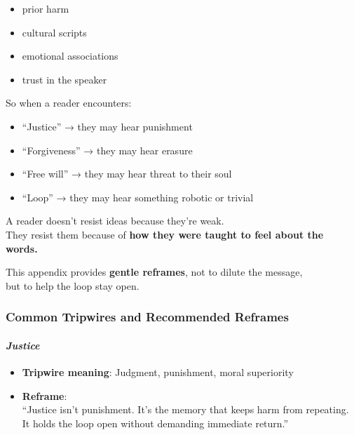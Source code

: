 \begin{itemize}
\item
  prior harm
\item
  cultural scripts
\item
  emotional associations
\item
  trust in the speaker
\end{itemize}

So when a reader encounters:

\begin{itemize}
\item
  ``Justice'' → they may hear punishment
\item
  ``Forgiveness'' → they may hear erasure
\item
  ``Free will'' → they may hear threat to their soul
\item
  ``Loop'' → they may hear something robotic or trivial
\end{itemize}

A reader doesn't resist ideas because they're weak.\\
They resist them because of \textbf{how they were taught to feel about
the words.}

This appendix provides \textbf{gentle reframes}, not to dilute the
message,\\
but to help the loop stay open.

\subsubsection{\texorpdfstring{\textbf{Common Tripwires and
Recommended
Reframes}}{Common Tripwires and Recommended Reframes}}\label{common-tripwires-and-recommended-reframes}

\paragraph{\texorpdfstring{\textbf{\emph{Justice}}}{Justice}}\label{justice}

\begin{itemize}
\item
  \textbf{Tripwire meaning}: Judgment, punishment, moral superiority
\item
  \textbf{Reframe}:\\
  ``Justice isn't punishment. It's the memory that keeps harm from
  repeating.\\
  It holds the loop open without demanding immediate return.''
\end{itemize}

